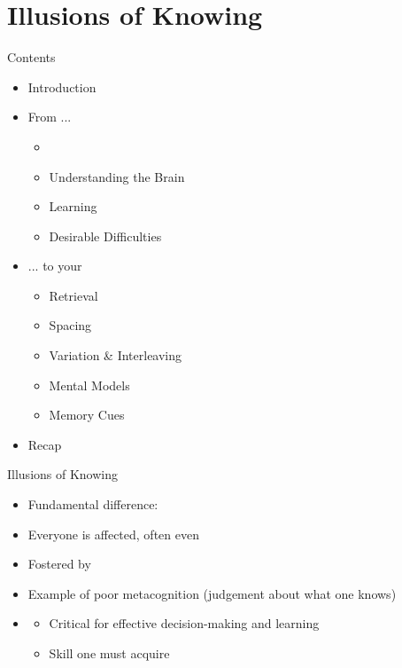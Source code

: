 \documentclass{ercisbeamer}
\begin{document}
\section{Illusions of Knowing}
\begin{frame}{Contents}
    \begin{itemize}
        \item Introduction
        \item From ...
        \begin{itemize}
            \item {}
            \item Understanding the Brain
            \item Learning
            \item Desirable Difficulties
        \end{itemize}
        \item ... to your 
        \begin{itemize}
            \item Retrieval
            \item Spacing
            \item Variation \& Interleaving
            \item Mental Models
            \item Memory Cues
        \end{itemize}
        \item Recap
    \end{itemize}
\end{frame}

\begin{frame}{Illusions of Knowing}
    \begin{tbox}
        \begin{itemize}
            \item Fundamental difference: 
            \item Everyone is affected, often  even 
            \item Fostered by 
            \item Example of poor metacognition (judgement about what one knows)
            \item {}
            \begin{itemize}
                \item Critical for effective decision-making and learning
                \item Skill one must acquire
            \end{itemize}
        \end{itemize}
    \end{tbox}
\end{frame}
\end{document}
